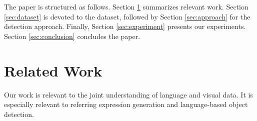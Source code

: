 \documentclass[10pt,twocolumn,letterpaper]{article}
\begin{document}

The paper is structured as follows. Section \ref{sec:related}
summarizes relevant work. Section \ref{sec:dataset} is devoted to the
dataset, followed by Section \ref{sec:approach} for the detection
approach. Finally, Section \ref{sec:experiment} presents our
experiments. Section \ref{sec:conclusion} concludes the paper.




\section{Related Work}
\label{sec:related} 

Our work is relevant to the joint understanding of language and visual data. It is especially relevant to referring expression generation and language-based object detection. 
\end{document}
